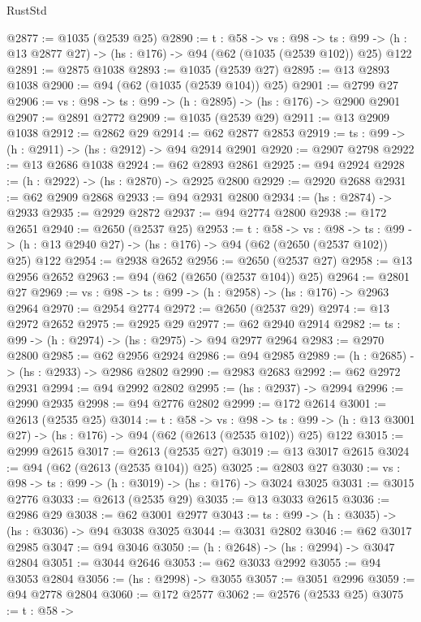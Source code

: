 \begin{lexlean}{RustStd}
\begin{coremodule}
{\begin{coremodule}
{{{{{{{{{@2877 := @1035 (@2539 @25)
@2890 := {t : @58} ->
  {vs : @98} ->
  {ts : @99} -> (h : @13 @2877 @27) -> (hs : @176) -> @94 (@62 (@1035 (@2539 @102)) @25) @122
@2891 := @2875 @1038
@2893 := @1035 (@2539 @27)
@2895 := @13 @2893 @1038
@2900 := @94 (@62 (@1035 (@2539 @104)) @25)
@2901 := @2799 @27
@2906 := {vs : @98} -> {ts : @99} -> (h : @2895) -> (hs : @176) -> @2900 @2901
@2907 := @2891 @2772
@2909 := @1035 (@2539 @29)
@2911 := @13 @2909 @1038
@2912 := @2862 @29
@2914 := @62 @2877 @2853
@2919 := {ts : @99} -> (h : @2911) -> (hs : @2912) -> @94 @2914 @2901
@2920 := @2907 @2798
@2922 := @13 @2686 @1038
@2924 := @62 @2893 @2861
@2925 := @94 @2924
@2928 := (h : @2922) -> (hs : @2870) -> @2925 @2800
@2929 := @2920 @2688
@2931 := @62 @2909 @2868
@2933 := @94 @2931 @2800
@2934 := (hs : @2874) -> @2933
@2935 := @2929 @2872
@2937 := @94 @2774 @2800
@2938 := @172 @2651
@2940 := @2650 (@2537 @25)
@2953 := {t : @58} ->
  {vs : @98} ->
  {ts : @99} -> (h : @13 @2940 @27) -> (hs : @176) -> @94 (@62 (@2650 (@2537 @102)) @25) @122
@2954 := @2938 @2652
@2956 := @2650 (@2537 @27)
@2958 := @13 @2956 @2652
@2963 := @94 (@62 (@2650 (@2537 @104)) @25)
@2964 := @2801 @27
@2969 := {vs : @98} -> {ts : @99} -> (h : @2958) -> (hs : @176) -> @2963 @2964
@2970 := @2954 @2774
@2972 := @2650 (@2537 @29)
@2974 := @13 @2972 @2652
@2975 := @2925 @29
@2977 := @62 @2940 @2914
@2982 := {ts : @99} -> (h : @2974) -> (hs : @2975) -> @94 @2977 @2964
@2983 := @2970 @2800
@2985 := @62 @2956 @2924
@2986 := @94 @2985
@2989 := (h : @2685) -> (hs : @2933) -> @2986 @2802
@2990 := @2983 @2683
@2992 := @62 @2972 @2931
@2994 := @94 @2992 @2802
@2995 := (hs : @2937) -> @2994
@2996 := @2990 @2935
@2998 := @94 @2776 @2802
@2999 := @172 @2614
@3001 := @2613 (@2535 @25)
@3014 := {t : @58} ->
  {vs : @98} ->
  {ts : @99} -> (h : @13 @3001 @27) -> (hs : @176) -> @94 (@62 (@2613 (@2535 @102)) @25) @122
@3015 := @2999 @2615
@3017 := @2613 (@2535 @27)
@3019 := @13 @3017 @2615
@3024 := @94 (@62 (@2613 (@2535 @104)) @25)
@3025 := @2803 @27
@3030 := {vs : @98} -> {ts : @99} -> (h : @3019) -> (hs : @176) -> @3024 @3025
@3031 := @3015 @2776
@3033 := @2613 (@2535 @29)
@3035 := @13 @3033 @2615
@3036 := @2986 @29
@3038 := @62 @3001 @2977
@3043 := {ts : @99} -> (h : @3035) -> (hs : @3036) -> @94 @3038 @3025
@3044 := @3031 @2802
@3046 := @62 @3017 @2985
@3047 := @94 @3046
@3050 := (h : @2648) -> (hs : @2994) -> @3047 @2804
@3051 := @3044 @2646
@3053 := @62 @3033 @2992
@3055 := @94 @3053 @2804
@3056 := (hs : @2998) -> @3055
@3057 := @3051 @2996
@3059 := @94 @2778 @2804
@3060 := @172 @2577
@3062 := @2576 (@2533 @25)
@3075 := {t : @58} ->
}}}}}}}}}
\end{coremodule}}
\end{coremodule}
\end{lexlean}

